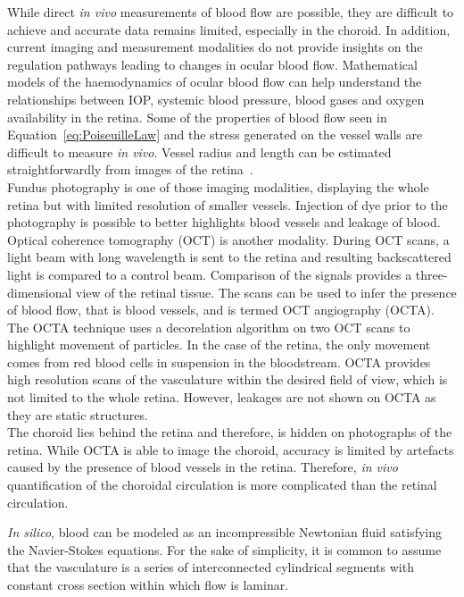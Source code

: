 \documentclass[12pt,a4paper]{journal}
\begin{document}
While direct \textit{in vivo} measurements of blood flow are possible, they are difficult to achieve and accurate data remains limited, especially in the choroid.
In addition, current imaging and measurement modalities do not provide insights on the regulation pathways leading to changes in ocular blood flow.
Mathematical models of the haemodynamics of ocular blood flow can help understand the relationships between IOP, systemic blood pressure, blood gases and oxygen availability in the retina.
Some of the properties of blood flow seen in Equation~\ref{eq:PoiseuilleLaw} and the stress generated on the vessel walls are difficult to measure \textit{in vivo}.
Vessel radius and length can be estimated straightforwardly from images of the retina~\cite{DoblhoffDier2014}.\\
Fundus photography is one of those imaging modalities, displaying the whole retina but with limited resolution of smaller vessels.
Injection of dye prior to the photography is possible to better highlights blood vessels and leakage of blood.\\
Optical coherence tomography (OCT) is another modality.
During OCT scans, a light beam with long wavelength is sent to the retina and resulting backscattered light is compared to a control beam.
Comparison of the signals provides a three-dimensional view of the retinal tissue.
The scans can be used to infer the presence of blood flow, that is blood vessels, and is termed OCT angiography (OCTA).
The OCTA technique uses a decorelation algorithm on two OCT scans to highlight movement of particles.
In the case of the retina, the only movement comes from red blood cells in suspension in the bloodstream.
OCTA provides high resolution scans of the vasculature within the desired field of view, which is not limited to the whole retina.
However, leakages are not shown on OCTA as they are static structures.\\
The choroid lies behind the retina and therefore, is hidden on photographs of the retina.
While OCTA is able to image the choroid, accuracy is limited by artefacts caused by the presence of blood vessels in the retina.
Therefore, \textit{in vivo} quantification of the choroidal circulation is more complicated than the retinal circulation.

\textit{In silico}, blood can be modeled as an incompressible Newtonian fluid satisfying the Navier-Stokes equations.
For the sake of simplicity, it is common to assume that the vasculature is a series of interconnected cylindrical segments with constant cross section within which flow is laminar.
\end{document}
